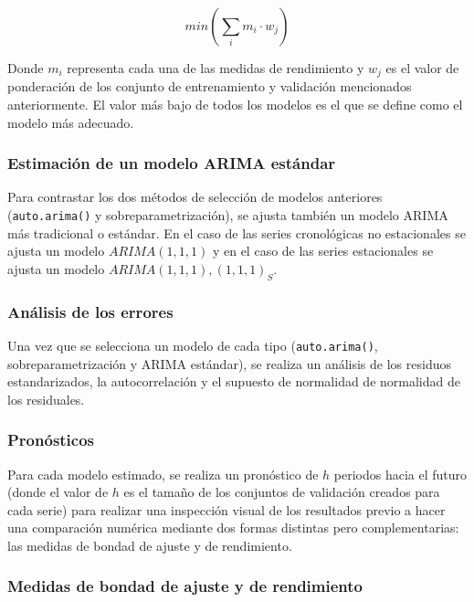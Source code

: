 \documentclass[
]{article}
\begin{document}
\begin{equation}
\label{eqn:concenso}
min\left( \sum_i {m_i}\cdot w_j \right)
\end{equation}

Donde \(m_i\) representa cada una de las medidas de rendimiento y
\(w_j\) es el valor de ponderación de los conjunto de entrenamiento y
validación mencionados anteriormente. El valor más bajo de todos los
modelos es el que se define como el modelo más adecuado.

\subsubsection{Estimación de un modelo ARIMA estándar}

Para contrastar los dos métodos de selección de modelos anteriores
(\texttt{auto.arima()} y sobreparametrización), se ajusta también un
modelo ARIMA más tradicional o estándar. En el caso de las series
cronológicas no estacionales se ajusta un modelo \(ARIMA(1,1,1)\) y en
el caso de las series estacionales se ajusta un modelo
\(ARIMA(1,1,1),(1,1,1)_S\).

\subsubsection{Análisis de los errores}

Una vez que se selecciona un modelo de cada tipo (\texttt{auto.arima()},
sobreparametrización y ARIMA estándar), se realiza un análisis de los
residuos estandarizados, la autocorrelación y el supuesto de normalidad
de normalidad de los residuales.

\subsubsection{Pronósticos}

Para cada modelo estimado, se realiza un pronóstico de \(h\) periodos
hacia el futuro (donde el valor de \(h\) es el tamaño de los conjuntos
de validación creados para cada serie) para realizar una inspección
visual de los resultados previo a hacer una comparación numérica
mediante dos formas distintas pero complementarias: las medidas de
bondad de ajuste y de rendimiento.

\subsubsection{Medidas de bondad de ajuste y de rendimiento}
\end{document}
